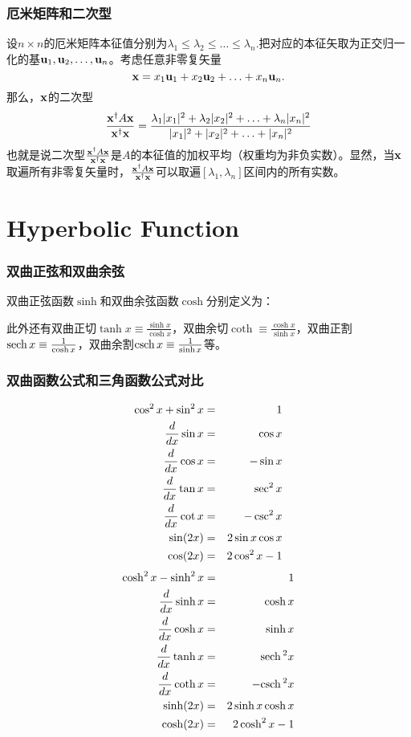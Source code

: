 \documentclass[CJK,13pt]{beamer}
\begin{document}
\begin{frame}
  \frametitle{厄米矩阵和二次型}
  设$n\times n$的厄米矩阵本征值分别为$\lambda_1\le\lambda_2\le\ldots\le\lambda_n$.把对应的本征矢取为正交归一化的基${\mathbf{u}}_1,{\mathbf{u}}_2,\ldots, {\mathbf{u}}_n$。考虑任意非零复矢量
  $$ {\mathbf{x}} = x_1{\mathbf{u}}_1 + x_2{\mathbf{u}}_2+\ldots+x_n{\mathbf{u}}_n.$$
  那么，${\mathbf{x}}$的二次型
  $$\frac{{\mathbf{x}}^\dagger A{\mathbf{x}}}{{\mathbf{x}}^\dagger {\mathbf{x}}} = \frac{\lambda_1|x_1|^2 + \lambda_2|x_2|^2+\ldots + \lambda_n|x_n|^2}{|x_1|^2+|x_2|^2+\ldots+|x_n|^2}$$
  也就是说二次型$\frac{{\mathbf{x}}^\dagger A{\mathbf{x}}}{{\mathbf{x}}^\dagger {\mathbf{x}}}$是$A$的本征值的加权平均（权重均为非负实数）。显然，当${\mathbf{x}}$取遍所有非零复矢量时，$\frac{{\mathbf{x}}^\dagger A{\mathbf{x}}}{{\mathbf{x}}^\dagger {\mathbf{x}}}$可以取遍$[\lambda_1, \lambda_n]$区间内的所有实数。
\end{frame}


\section{Hyperbolic Function}



\begin{frame}
\frametitle{双曲正弦和双曲余弦}

双曲正弦函数$\sinh$和双曲余弦函数$\cosh$分别定义为：



此外还有双曲正切$\tanh x \equiv \frac{\sinh x }{ \cosh x}$，双曲余切$\coth\equiv  \frac{ \cosh x}{\sinh x }$，双曲正割$\mathrm{sech}\, x\equiv \frac{1}{\cosh x}$，双曲余割$\mathrm{csch}\, x\equiv \frac{1}{\sinh x}$等。
\end{frame}

\begin{frame}
\frametitle{双曲函数公式和三角函数公式对比}

\begin{eqnarray}
  \cos^2x + \sin^2x   &=& 1 \nonumber \\
  \frac{d}{dx}\sin x   &=& \cos x \nonumber \\
  \frac{d}{dx}\cos x   &=& -\sin x \nonumber \\
  \frac{d}{dx}\tan x   &=& \sec^2 x \nonumber \\  
  \frac{d}{dx}\cot x   &=& -\csc^2 x \nonumber \\  
  \sin(2x) &=& 2\sin x \cos x \nonumber \\
  \cos(2x) &=& 2\cos^2 x - 1 \nonumber
\end{eqnarray}
\emini
{}
\begin{eqnarray}
 \cosh^2x - \sinh^2x   &=& 1 \nonumber \\
  \frac{d}{dx}\sinh x   &=& \cosh x \nonumber \\
  \frac{d}{dx}\cosh x   &=& \sinh x \nonumber \\
  \frac{d}{dx}\tanh x   &=& \mathrm{sech}\,^2 x \nonumber \\    
  \frac{d}{dx}\coth x   &=& -\mathrm{csch}\,^2 x \nonumber \\    
  \sinh(2x) &=& 2\sinh x \cosh x \nonumber \\
  \cosh(2x) &=& 2\cosh^2x - 1 \nonumber
\end{eqnarray}
\emini
\end{frame}
\end{document}
